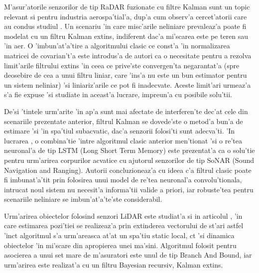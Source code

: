\documentclass[12pt,a4paper,twoside]{report}
\begin{document}
\vspace{5px}

M'asur'atorile senzorilor de tip RaDAR fuzionate cu filtre Kalman sunt un topic relevant si pentru industria aerospa'tial'a, dup'a cum observ'a cercet'atorii care au condus studiul \cite{designs5030054}. Un scenariu 'in care misc'arile neliniare prevaleaz'a poate fi modelat cu un filtru Kalman extins, indiferent dac'a mi'scarea este pe teren sau 'in aer. O 'imbun'at'a'tire a algoritmului clasic ce const'a 'in normalizarea matricei de covarian't'a este introdus'a de autori ca o necesitate pentru a rezolva limit'arile filtrului extins 'in ceea ce prive'ste convergen'ta negarantat'a (spre deosebire de cea a unui filtru liniar, care 'ins'a nu este un bun estimator pentru un sistem neliniar) 'si liniariz'arile ce pot fi inadecvate. Aceste limit'ari urmeaz'a s'a fie expuse 'si studiate in aceast'a lucrare, impreun'a cu posibile solu'tii.

\vspace{5px}

De'si 'tintele urm'arite 'in ap'a sunt mai afectate de interferen'te dec'at cele din scenariile prezentate anterior, filtrul Kalman se dovede'ste o metod'a bun'a de estimare 'si 'in spa'tiul subacvatic, dac'a senzorii folosi'ti sunt adecva'ti. 'In lucrarea \cite{app12105233}, o combina'tie 'intre algoritmul clasic anterior men'tionat 'si o re'tea neuronal'a de tip LSTM (Long Short Term Memory) este prezentat'a ca o solu'tie pentru urm'arirea corpurilor acvatice cu ajutorul senzorilor de tip SoNAR (Sound Navigation and Ranging). Autorii concluzioneaz'a cu ideea c'a filtrul clasic poate fi imbunat'a'tit prin folosirea unui model de re'tea neuronal'a convolu'tionala, intruc\ia at noul sistem nu necesit'a informa'tii valide a priori, iar robuste'tea pentru scenariile neliniare se imbun'at'a'te'ste considerabil. 

\vspace{5px}


Urm'arirea obiectelor folosind senzori LiDAR este studiat'a si in articolul \cite{doi:10.1177/0278364914562237}, 'in care estimarea pozi'tiei se realizeaz'a prin extinderea vectorului de st'ari astfel 'inc\ia t algoritmul s'a urm'areasca at'at un spa'tiu static local, c\ia t 'si dinamica obiectelor 'in mi'scare din apropierea unei ma'sini. Algoritmul folosit pentru asocierea a unui set mare de m'asuratori este unul de tip Branch And Bound, iar urm'arirea este realizat'a cu un filtru Bayesian recursiv, Kalman extins.

\vspace{5px}
\end{document}
